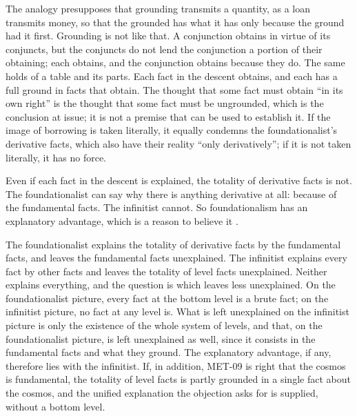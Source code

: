 \documentclass{situationist-preprint}
\begin{document}
\begin{reply}
The analogy presupposes that grounding transmits a quantity, as a loan transmits money, so that the grounded has what it has only because the ground had it first. Grounding is not like that. A conjunction obtains in virtue of its conjuncts, but the conjuncts do not lend the conjunction a portion of their obtaining; each obtains, and the conjunction obtains because they do. The same holds of a table and its parts. Each fact in the descent obtains, and each has a full ground in facts that obtain. The thought that some fact must obtain \enquote{in its own right} is the thought that some fact must be ungrounded, which is the conclusion at issue; it is not a premise that can be used to establish it. If the image of borrowing is taken literally, it equally condemns the foundationalist's derivative facts, which also have their reality \enquote{only derivatively}; if it is not taken literally, it has no force.
\end{reply}

\begin{objection}\label{o:unified}
Even if each fact in the descent is explained, the totality of derivative facts is not. The foundationalist can say why there is anything derivative at all: because of the fundamental facts. The infinitist cannot. So foundationalism has an explanatory advantage, which is a reason to believe it \citep{Cameron2008}.
\end{objection}

\begin{reply}
The foundationalist explains the totality of derivative facts by the fundamental facts, and leaves the fundamental facts unexplained. The infinitist explains every fact by other facts and leaves the totality of level facts unexplained. Neither explains everything, and the question is which leaves less unexplained. On the foundationalist picture, every fact at the bottom level is a brute fact; on the infinitist picture, no fact at any level is. What is left unexplained on the infinitist picture is only the existence of the whole system of levels, and that, on the foundationalist picture, is left unexplained as well, since it consists in the fundamental facts and what they ground. The explanatory advantage, if any, therefore lies with the infinitist. If, in addition, MET-09 is right that the cosmos is fundamental, the totality of level facts is partly grounded in a single fact about the cosmos, and the unified explanation the objection asks for is supplied, without a bottom level.
\end{reply}
\end{document}
